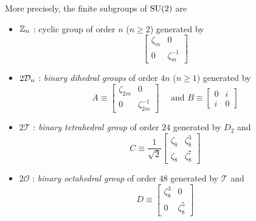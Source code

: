 \documentclass[a4paper,11pt]{article}
\begin{document}
        More precisely, the finite subgroups of $\text{SU}(2)$ are
        \begin{itemize}
            \item $\mathbb{Z}_n$ : cyclic group of order $n$ ($n\geq2$) generated by
            \begin{equation}
                \begin{bmatrix}
                    \zeta_m & 0\\
                    0 & \zeta^{-1}_m
                \end{bmatrix}
            \end{equation}
            \item $2\mathcal{D}_n$ : \emph{binary dihedral groups} of order $4n$ ($n\geq1$) generated by
            \begin{equation}
                A \equiv
                \begin{bmatrix}
                    \zeta_{2m} & 0\\
                    0 & \zeta^{-1}_{2m}
                \end{bmatrix}\quad \text{ and }
                B \equiv 
                \begin{bmatrix}
                    0 & i\\
                    i & 0
                \end{bmatrix}
            \end{equation}
            \item $2\mathcal{T}$ : \emph{binary tetrahedral group} of order $24$ generated by $D_2$ and
            \begin{equation}
                C \equiv \frac{1}{\sqrt{2}}
                \begin{bmatrix}
                    \zeta_8 & \zeta^3_8\\
                    \zeta_8 & \zeta^7_8
                \end{bmatrix}
            \end{equation}
            \item $2\mathcal{O}$ : \emph{binary octahedral group} of order $48$ generated by $\mathcal{T}$ and
            \begin{equation}
                D \equiv 
                \begin{bmatrix}
                    \zeta^3_8 & 0\\
                    0 & \zeta^5_8
                \end{bmatrix}
            \end{equation}

\end{itemize}
\end{document}
